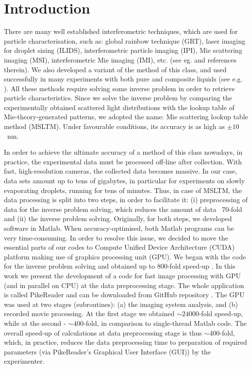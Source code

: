 \documentclass[12pt,dvips]{elsarticle}
\begin{document}
\section{Introduction}
There are many well established interferometric techniques, which are used for particle characterisation, such as: global
rainbow technique (GRT), laser imaging for droplet sizing (ILIDS), interferometric particle imaging (IPI), Mie scattering
imaging (MSI), interferometric Mie imaging (IMI), etc. (see eg. \cite{Dehaeck} and references therein). We also developed
a variant of the method of this class, and used successfully in many experiments with both pure and composite liquids (see
e.g. \cite{N2andAir,liquids,RoP,weightvsscatt}). All these methods require solving some inverse problem in order to
retrieve particle characteristics. Since we solve the inverse problem by comparing the experimentally obtained scattered
light distributions with the lookup table of Mie-theory-generated patterns, we adopted the name: Mie scattering lookup
table method (MSLTM). Under favourable conditions, its accuracy is as high as $\pm 10$~nm.

In order to achieve the ultimate accuracy of a method of this class nowadays, in practice, the experimental data must be
processed off-line after collection. With fast, high-resolution cameras, the collected data becomes massive. In our case,
data sets amount up to tens of gigabytes, in particular for experiments on slowly evaporating droplets, running for tens
of minutes. Thus, in case of MSLTM, the data processing is split into two steps, in order to facilitate it: (i)
preprocessing of data for the inverse problem solving, which reduces the amount of data ~70-fold and (ii) the inverse
problem solving. Originally, for both steps, we developed software in Matlab. When accuracy-optimised, both Matlab
programs can be very time-consuming. In order to resolve this issue, we decided to move the essential parts of our codes
to Compute Unified Device Architecture (CUDA) platform making use of graphics processing unit (GPU). We began with the
code for the inverse problem solving and obtained up to 800-fold speed-up \cite{Smigacz}. In this work we present the
development of a code for fast image processing with GPU (and in parallel on CPU) at the data preprocessing stage. The
whole application is called PikeReader and can be downloaded from GitHub repository \cite{PikeReader}. The GPU was used at
two stages (subroutines): (a) the imaging system analysis, and (b) recorded movie processing. At the first stage we
obtained $\sim 24000$-fold speed-up, while at the second - $\sim 400$-fold, in comparison to single-thread Matlab code.
The overall speed-up of calculations at data preprocessing stage is thus $\sim 400$-fold, which, in practice, reduces the
data preprocessing time to preparation of required parameters (via PikeReader's Graphical User Interface (GUI)) by the
experimenter.
\end{document}
